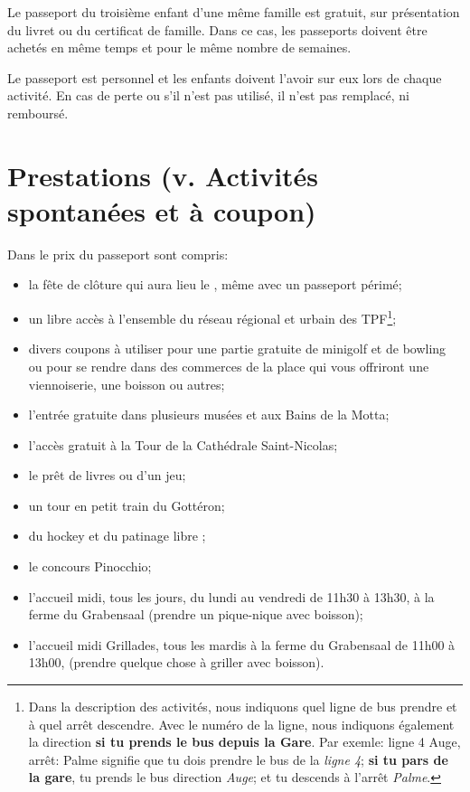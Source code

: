 Le passeport du troisième enfant d'une même famille est gratuit, sur présentation du livret ou du certificat de famille.
Dans ce cas, les passeports doivent être achetés en même temps et pour le même nombre de semaines.

Le passeport est personnel et les enfants doivent l'avoir sur eux lors de chaque activité. En cas de perte ou s'il n'est
pas utilisé, il n'est pas remplacé, ni remboursé.

\section*{Prestations (v. \og{}Activités spontanées et à coupon\fg{})}

Dans le prix du passeport sont compris:

\begin{itemize}
\item la fête de clôture qui aura lieu le  , même avec un passeport périmé;
\item un libre accès à l'ensemble du réseau régional et urbain des TPF\footnote{Dans la description des activités,
nous indiquons quel ligne de bus prendre et à quel arrêt descendre. Avec le numéro de la ligne, nous indiquons
également la direction \textbf{si tu prends le bus depuis la Gare}. Par exemle: \og{}ligne 4 Auge, arrêt: Palme\fg{} signifie que tu
dois prendre le bus de la \emph{ligne 4}; \textbf{si tu pars de la gare}, tu prends le bus direction \emph{Auge}; et tu
descends à l'arrêt \emph{Palme}.};
\item divers coupons à utiliser pour une partie gratuite de minigolf et de bowling ou pour se rendre dans des commerces
de la place qui vous offriront une viennoiserie, une boisson ou autres;
\item l'entrée gratuite dans plusieurs musées et aux Bains de la Motta;
\item l'accès gratuit à la Tour de la Cathédrale Saint-Nicolas;
\item le prêt de livres ou d'un jeu;
\item un tour en petit train du Gottéron;
\item du hockey et du patinage libre ;
\item le concours \og{}Pinocchio\fg{};
\item l'accueil midi, tous les jours, du lundi au vendredi de 11h30 à 13h30, à la ferme du Grabensaal
(prendre un pique-nique avec boisson);
\item l'accueil midi \og{}Grillades\fg{}, tous les mardis à la ferme du Grabensaal de 11h00 à 13h00,
(prendre quelque chose à griller avec boisson).

\end{itemize}
\newpage
